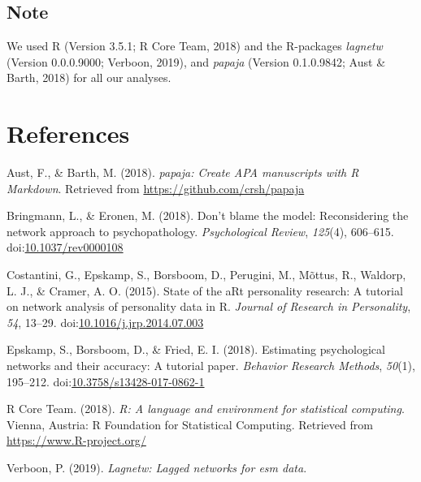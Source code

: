 \documentclass[man,floatsintext]{apa6}
\begin{document}
\subsection{Note}\label{note}

We used R (Version 3.5.1; R Core Team, 2018) and the R-packages
\emph{lagnetw} (Version 0.0.0.9000; Verboon, 2019), and \emph{papaja}
(Version 0.1.0.9842; Aust \& Barth, 2018) for all our analyses.

\newpage

\section{References}\label{references}

\begingroup
\setlength{\parindent}{-0.5in} \setlength{\leftskip}{0.5in}

\hypertarget{refs}{}
\hypertarget{ref-R-papaja}{}
Aust, F., \& Barth, M. (2018). \emph{papaja: Create APA manuscripts with
R Markdown}. Retrieved from \url{https://github.com/crsh/papaja}

\hypertarget{ref-Bringmann2018a}{}
Bringmann, L., \& Eronen, M. (2018). Don't blame the model:
Reconsidering the network approach to psychopathology.
\emph{Psychological Review}, \emph{125}(4), 606--615.
doi:\href{https://doi.org/10.1037/rev0000108}{10.1037/rev0000108}

\hypertarget{ref-Costantini2015}{}
Costantini, G., Epskamp, S., Borsboom, D., Perugini, M., Mõttus, R.,
Waldorp, L. J., \& Cramer, A. O. (2015). State of the aRt personality
research: A tutorial on network analysis of personality data in R.
\emph{Journal of Research in Personality}, \emph{54}, 13--29.
doi:\href{https://doi.org/10.1016/j.jrp.2014.07.003}{10.1016/j.jrp.2014.07.003}

\hypertarget{ref-Epskamp2018}{}
Epskamp, S., Borsboom, D., \& Fried, E. I. (2018). Estimating
psychological networks and their accuracy: A tutorial paper.
\emph{Behavior Research Methods}, \emph{50}(1), 195--212.
doi:\href{https://doi.org/10.3758/s13428-017-0862-1}{10.3758/s13428-017-0862-1}

\hypertarget{ref-R-base}{}
R Core Team. (2018). \emph{R: A language and environment for statistical
computing}. Vienna, Austria: R Foundation for Statistical Computing.
Retrieved from \url{https://www.R-project.org/}

\hypertarget{ref-R-lagnetw}{}
Verboon, P. (2019). \emph{Lagnetw: Lagged networks for esm data}.

\endgroup
\end{document}
